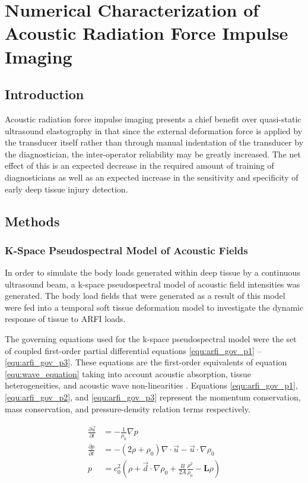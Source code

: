 \chapter{Numerical Characterization of Acoustic Radiation Force Impulse Imaging}
	\label{chap:arfi}
	\section{Introduction}
		Acoustic radiation force impulse imaging presents a chief benefit over quasi-static ultrasound elastography in that since the external deformation force is applied by the transducer itself rather than through manual indentation of the transducer by the diagnostician, the inter-operator reliability may be greatly increased. The net effect of this is an expected decrease in the required amount of training of diagnosticians as well as an expected increase in the sensitivity and specificity of early deep tissue injury detection.

	\section{Methods}
		\subsection{K-Space Pseudospectral Model of Acoustic Fields}
			In order to simulate the body loads generated within deep tissue by a continuous ultrasound beam, a k-space pseudospectral model of acoustic field intensities was generated. The body load fields that were generated as a result of this model were fed into a temporal soft tissue deformation model to investigate the dynamic response of tissue to ARFI loads.

			The governing equations used for the k-space pseudospectral model were the set of coupled first-order partial differential equations \ref{equ:arfi_gov_p1} -- \ref{equ:arfi_gov_p3}. These equations are the first-order equivalents of equation \ref{equ:wave_equation} taking into account acoustic absorption, tissue heterogeneities, and acoustic wave non-linearities \cite{treeby12}. Equations \ref{equ:arfi_gov_p1}, \ref{equ:arfi_gov_p2}, and \ref{equ:arfi_gov_p3} represent the momentum conservation, mass conservation, and pressure-density relation terms respectively.

			\begin{subequations}
				\label{equ:arfi_gov}
				\begin{align}
					\frac{\partial \vec{u}}{\partial t} &= - \frac{1}{\rho_0} \nabla p \label{equ:arfi_gov_p1} \\
					\frac{\partial p}{\partial t} &= -\left(2 \rho + \rho_0\right)\nabla \cdot \vec{u} - \vec{u} \cdot \nabla \rho_0 \label{equ:arfi_gov_p2} \\
					p &= c_0^2 \left(\rho + \vec{d} \cdot \nabla \rho_0 + \frac{B}{2A} \frac{\rho^2}{\rho_0} - \mathbf{L}\rho \right) \label{equ:arfi_gov_p3}
				\end{align}
			\end{subequations}

